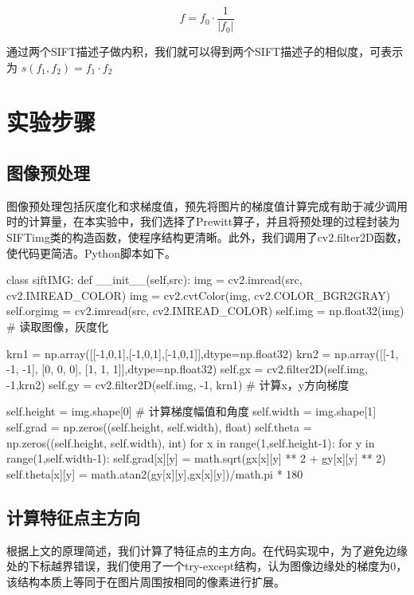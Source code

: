 \documentclass{article}
\begin{document}
$$
f=f_{0} \cdot \frac{1}{\left|f_{0}\right|}
$$

通过两个SIFT描述子做内积，我们就可以得到两个SIFT描述子的相似度，可表示为
$
s\left(f_{1}, f_{2}\right)=f_{1} \cdot f_{2}
$

\section{实验步骤}

\subsection{图像预处理}

图像预处理包括灰度化和求梯度值，预先将图片的梯度值计算完成有助于减少调用时的计算量，在本实验中，我们选择了Prewitt算子，并且将预处理的过程封装为SIFTimg类的构造函数，使程序结构更清晰。此外，我们调用了cv2.filter2D函数，使代码更简洁。Python脚本如下。
\begin{python}
class siftIMG:
    def __init__(self,src):
        img = cv2.imread(src, cv2.IMREAD_COLOR)
        img = cv2.cvtColor(img, cv2.COLOR_BGR2GRAY)
        self.orgimg = cv2.imread(src, cv2.IMREAD_COLOR)
        self.img = np.float32(img)                            # 读取图像，灰度化

        krn1 = np.array([[-1,0,1],[-1,0,1],[-1,0,1]],dtype=np.float32)
        krn2 = np.array([[-1, -1, -1], [0, 0, 0], [1, 1, 1]],dtype=np.float32)
        self.gx = cv2.filter2D(self.img, -1,krn2)
        self.gy = cv2.filter2D(self.img, -1, krn1)            # 计算x，y方向梯度

        self.height = img.shape[0]                            # 计算梯度幅值和角度
        self.width = img.shape[1]
        self.grad = np.zeros((self.height, self.width), float)
        self.theta = np.zeros((self.height, self.width), int)
        for x in range(1,self.height-1):
            for y in range(1,self.width-1):
                self.grad[x][y] = math.sqrt(gx[x][y] ** 2 + gy[x][y] ** 2)
                self.theta[x][y] = math.atan2(gy[x][y],gx[x][y])/math.pi * 180
\end{python}

\subsection{计算特征点主方向}

根据上文的原理简述，我们计算了特征点的主方向。在代码实现中，为了避免边缘处的下标越界错误，我们使用了一个try-except结构，认为图像边缘处的梯度为0，该结构本质上等同于在图片周围按相同的像素进行扩展。
\end{document}
